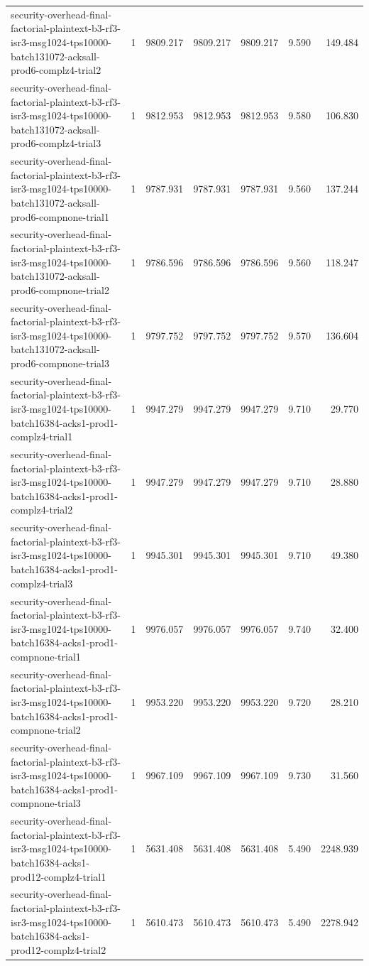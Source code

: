 \begin{tabular}{lrrrrrr}
security-overhead-final-factorial-plaintext-b3-rf3-isr3-msg1024-tps10000-batch131072-acksall-prod6-complz4-trial2 & 1 & 9809.217 & 9809.217 & 9809.217 & 9.590 & 149.484 \\
security-overhead-final-factorial-plaintext-b3-rf3-isr3-msg1024-tps10000-batch131072-acksall-prod6-complz4-trial3 & 1 & 9812.953 & 9812.953 & 9812.953 & 9.580 & 106.830 \\
security-overhead-final-factorial-plaintext-b3-rf3-isr3-msg1024-tps10000-batch131072-acksall-prod6-compnone-trial1 & 1 & 9787.931 & 9787.931 & 9787.931 & 9.560 & 137.244 \\
security-overhead-final-factorial-plaintext-b3-rf3-isr3-msg1024-tps10000-batch131072-acksall-prod6-compnone-trial2 & 1 & 9786.596 & 9786.596 & 9786.596 & 9.560 & 118.247 \\
security-overhead-final-factorial-plaintext-b3-rf3-isr3-msg1024-tps10000-batch131072-acksall-prod6-compnone-trial3 & 1 & 9797.752 & 9797.752 & 9797.752 & 9.570 & 136.604 \\
security-overhead-final-factorial-plaintext-b3-rf3-isr3-msg1024-tps10000-batch16384-acks1-prod1-complz4-trial1 & 1 & 9947.279 & 9947.279 & 9947.279 & 9.710 & 29.770 \\
security-overhead-final-factorial-plaintext-b3-rf3-isr3-msg1024-tps10000-batch16384-acks1-prod1-complz4-trial2 & 1 & 9947.279 & 9947.279 & 9947.279 & 9.710 & 28.880 \\
security-overhead-final-factorial-plaintext-b3-rf3-isr3-msg1024-tps10000-batch16384-acks1-prod1-complz4-trial3 & 1 & 9945.301 & 9945.301 & 9945.301 & 9.710 & 49.380 \\
security-overhead-final-factorial-plaintext-b3-rf3-isr3-msg1024-tps10000-batch16384-acks1-prod1-compnone-trial1 & 1 & 9976.057 & 9976.057 & 9976.057 & 9.740 & 32.400 \\
security-overhead-final-factorial-plaintext-b3-rf3-isr3-msg1024-tps10000-batch16384-acks1-prod1-compnone-trial2 & 1 & 9953.220 & 9953.220 & 9953.220 & 9.720 & 28.210 \\
security-overhead-final-factorial-plaintext-b3-rf3-isr3-msg1024-tps10000-batch16384-acks1-prod1-compnone-trial3 & 1 & 9967.109 & 9967.109 & 9967.109 & 9.730 & 31.560 \\
security-overhead-final-factorial-plaintext-b3-rf3-isr3-msg1024-tps10000-batch16384-acks1-prod12-complz4-trial1 & 1 & 5631.408 & 5631.408 & 5631.408 & 5.490 & 2248.939 \\
security-overhead-final-factorial-plaintext-b3-rf3-isr3-msg1024-tps10000-batch16384-acks1-prod12-complz4-trial2 & 1 & 5610.473 & 5610.473 & 5610.473 & 5.490 & 2278.942 \\

\end{tabular}
